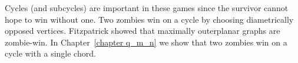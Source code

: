 Cycles (and subcycles) are important in these games since the survivor cannot hope to win without one. Two zombies win on a cycle by choosing diametrically opposed vertices. Fitzpatrick showed that maximally outerplanar graphs are zombie-win. In Chapter~\ref{chapter q_m_n} we show that two zombies win on a cycle with a single chord.
